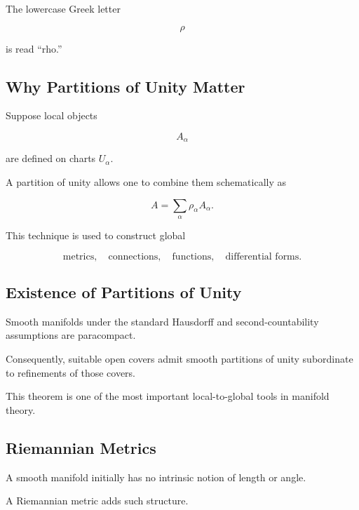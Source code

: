 The lowercase Greek letter

\[
\rho
\]

is read ``rho.''

\subsection{Why Partitions of Unity Matter}
\label{subsec:why-partitions-unity}

Suppose local objects

\[
A_\alpha
\]

are defined on charts \(U_\alpha\).

A partition of unity allows one to combine them schematically as

\[
\boxed{
A
=
\sum_\alpha\rho_\alpha A_\alpha.
}
\]

This technique is used to construct global

\[
\boxed{
\text{metrics},
\quad
\text{connections},
\quad
\text{functions},
\quad
\text{differential forms}.
}
\]

\subsection{Existence of Partitions of Unity}
\label{subsec:existence-partitions-unity}

Smooth manifolds under the standard Hausdorff and second-countability
assumptions are paracompact.

Consequently, suitable open covers admit smooth partitions of unity
subordinate to refinements of those covers.

This theorem is one of the most important local-to-global tools in manifold
theory.

\subsection{Riemannian Metrics}
\label{subsec:riemannian-metrics-manifolds}

A smooth manifold initially has no intrinsic notion of length or angle.

A Riemannian metric adds such structure.

